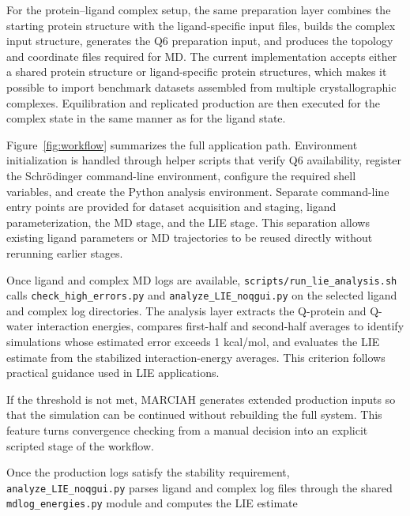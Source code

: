 \documentclass[journal=jcisd8,manuscript=article]{achemso}
\begin{document}
For the protein--ligand complex setup, the same preparation layer combines the starting protein structure with the ligand-specific input files, builds the complex input structure, generates the Q6 preparation input, and produces the topology and coordinate files required for MD. The current implementation accepts either a shared protein structure or ligand-specific protein structures, which makes it possible to import benchmark datasets assembled from multiple crystallographic complexes. Equilibration and replicated production are then executed for the complex state in the same manner as for the ligand state.

Figure~\ref{fig:workflow} summarizes the full application path. Environment initialization is handled through helper scripts that verify Q6 availability, register the Schr\"odinger command-line environment, configure the required shell variables, and create the Python analysis environment. Separate command-line entry points are provided for dataset acquisition and staging, ligand parameterization, the MD stage, and the LIE stage. This separation allows existing ligand parameters or MD trajectories to be reused directly without rerunning earlier stages.

Once ligand and complex MD logs are available, \texttt{scripts/run\_lie\_analysis.sh} calls \texttt{check\_high\_errors.py} and \texttt{analyze\_LIE\_noqgui.py} on the selected ligand and complex log directories. The analysis layer extracts the Q-protein and Q-water interaction energies, compares first-half and second-half averages to identify simulations whose estimated error exceeds 1 kcal/mol, and evaluates the LIE estimate from the stabilized interaction-energy averages. This criterion follows practical guidance used in LIE applications.\cite{gutierrez2012lie}

If the threshold is not met, MARCIAH generates extended production inputs so that the simulation can be continued without rebuilding the full system. This feature turns convergence checking from a manual decision into an explicit scripted stage of the workflow.

Once the production logs satisfy the stability requirement, \texttt{analyze\_LIE\_noqgui.py} parses ligand and complex log files through the shared \texttt{mdlog\_energies.py} module and computes the LIE estimate
\end{document}
